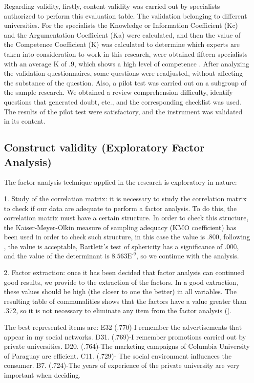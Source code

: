 \documentclass[english]{textolivre}
\begin{document}
Regarding validity, firstly, content validity was carried out by specialists authorized to perform this evaluation table. The validation belonging to different universities. For the specialists the Knowledge or Information Coefficient (Kc) and the Argumentation Coefficient (Ka) were calculated, and then the value of the Competence Coefficient (K) was calculated to determine which experts are taken into consideration to work in this research, were obtained fifteen specialists with an average K of .9, which shows a high level of competence \cite{mengual_importance_2011}. After analyzing the validation questionnaires, some questions were readjusted, without affecting the substance of the question. Also, a pilot test was carried out on a subgroup of the sample research. We obtained a review comprehension difficulty, identify questions that generated doubt, etc., and the corresponding checklist was used. The results of the pilot test were satisfactory, and the instrument was validated in its content.


\subsection{Construct validity (Exploratory Factor Analysis)}

The factor analysis technique applied in the research is exploratory in nature:

1. Study of the correlation matrix: it is necessary to study the correlation matrix to check if our data are adequate to perform a factor analysis. To do this, the correlation matrix must have a certain structure. In order to check this structure, the Kaiser-Meyer-Olkin measure of sampling adequacy (KMO coefficient) has been used in order to check such structure, in this case the value is .800, following \textcite{kaiser_index_1974}, the value is acceptable, Bartlett's test of sphericity has a significance of .000, and the value of the determinant is $\text{8.563E}^{\text{-9}}$, so we continue with the analysis.

2. Factor extraction: once it has been decided that factor analysis can continued good results, we provide to the extraction of the factors. In a good extraction, these values should be high (the closer to one the better) in all variables. The resulting table of communalities shows that the factors have a value greater than .372, so it is not necessary to eliminate any item from the factor analysis ().

The best represented items are: E32 (.770)-I remember the advertisements that appear in my social networks. D31. (.769)-I remember promotions carried out by private universities. D20. (.764)-The marketing campaigns of Columbia University of Paraguay are efficient. C11. (.729)- The social environment influences the consumer. B7. (.724)-The years of experience of the private university are very important when deciding.
\end{document}
